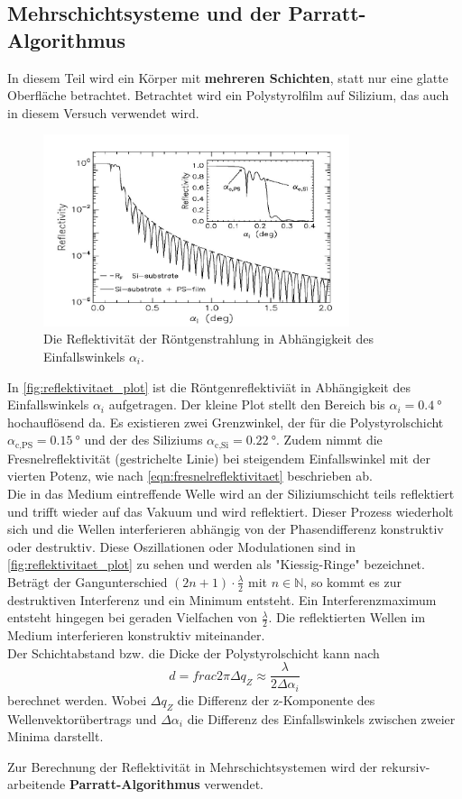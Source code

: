 \subsection{Mehrschichtsysteme und der Parratt-Algorithmus}
In diesem Teil wird ein Körper mit \textbf{mehreren Schichten}, statt nur eine glatte Oberfläche betrachtet.
Betrachtet wird ein Polystyrolfilm auf Silizium, das auch in diesem Versuch verwendet wird.
\begin{figure}
    \centering
    \includegraphics[width=0.8\textwidth]{content/data/reflektivitaet_plot.jpg}
    \caption{Die Reflektivität der Röntgenstrahlung in Abhängigkeit des Einfallswinkels $\alpha_i$.\cite[8]{anleitung_alt}}
    \label{fig:reflektivitaet_plot}
\end{figure}
In \autoref{fig:reflektivitaet_plot} ist die Röntgenreflektiviät in Abhängigkeit des Einfallswinkels $\alpha_i$ aufgetragen.
Der kleine Plot stellt den Bereich bis $\alpha_i = \SI{0.4}{\degree}$ hochauflösend da.
Es existieren zwei Grenzwinkel, der für die Polystyrolschicht $\alpha_\text{c,PS} = \SI{0.15}{\degree}$ und der des Siliziums $\alpha_\text{c,Si} = \SI{0.22}{\degree}$.
Zudem nimmt die Fresnelreflektivität (gestrichelte Linie) bei steigendem Einfallswinkel mit der vierten Potenz, wie nach \autoref{eqn:fresnelreflektivitaet} beschrieben ab.
\\
Die in das Medium eintreffende Welle wird an der Siliziumschicht teils reflektiert und trifft wieder auf das Vakuum und wird reflektiert.
Dieser Prozess wiederholt sich und die Wellen interferieren abhängig von der Phasendifferenz konstruktiv oder destruktiv.
Diese Oszillationen oder Modulationen sind in \autoref{fig:reflektivitaet_plot} zu sehen und werden als "Kiessig-Ringe" bezeichnet.
Beträgt der Gangunterschied $(2n+1) \cdot \frac{\lambda}{2}$ mit $n \in \mathbb{N}$, so kommt es zur destruktiven Interferenz und ein Minimum entsteht.
Ein Interferenzmaximum entsteht hingegen bei geraden Vielfachen von $\frac{\lambda}{2}$.
Die reflektierten Wellen im Medium interferieren konstruktiv miteinander.
\\
Der Schichtabstand bzw. die Dicke der Polystyrolschicht kann nach
\begin{equation}
    d = frac{2\pi}{\Delta q_Z} \approx \frac{\lambda}{2 \Delta \alpha_i}
    \label{eqn:abstand_schicht}
\end{equation}
berechnet werden.
Wobei $\Delta q_Z$ die Differenz der z-Komponente des Wellenvektorübertrags und $\Delta \alpha_i$ die Differenz des Einfallswinkels zwischen zweier Minima darstellt.
\FloatBarrier

Zur Berechnung der Reflektivität in Mehrschichtsystemen wird der rekursiv-arbeitende \textbf{Parratt-Algorithmus} verwendet.